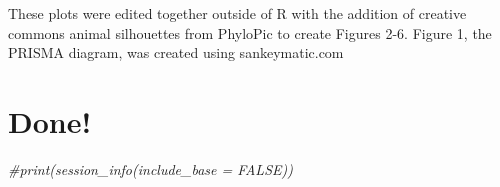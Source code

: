 \documentclass[]{article}
\newenvironment{Shaded}{\begin{snugshade}}{\end{snugshade}}
\newcommand{\CommentTok}[1]{\textcolor[rgb]{0.56,0.35,0.01}{\textit{#1}}}
\begin{document}
These plots were edited together outside of R with the addition of
creative commons animal silhouettes from PhyloPic to create Figures 2-6.
Figure 1, the PRISMA diagram, was created using sankeymatic.com

\section{Done!}\label{done}

\begin{Shaded}
\begin{Highlighting}[]
\CommentTok{#print(session_info(include_base = FALSE))}
\end{Highlighting}
\end{Shaded}
\end{document}
